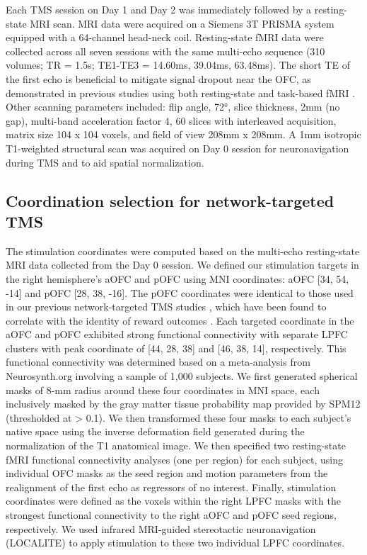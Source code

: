 \documentclass[lineno,sn-basic]{sn-jnl}%
\begin{document}
Each TMS session on Day 1 and Day 2 was immediately followed by a
resting-state MRI scan. MRI data were acquired on a Siemens 3T PRISMA
system equipped with a 64-channel head-neck coil. Resting-state fMRI
data were collected across all seven sessions with the same multi-echo
sequence (310 volumes; TR = 1.5s; TE1-TE3 = 14.60ms, 39.04ms, 63.48ms).
The short TE of the first echo is beneficial to mitigate signal dropout
near the OFC, as demonstrated in previous studies using both resting-state and task-based fMRI \citep{RN619,RN524,kirlutpos16,zhao24img}. Other scanning parameters included: flip angle, 72°, slice thickness, 2mm (no gap), multi-band acceleration factor 4, 60 slices with interleaved acquisition, matrix size 104 x 104 voxels, and field of view 208mm x 208mm. A 1mm isotropic T1-weighted structural scan was acquired on Day 0 session for neuronavigation during TMS and to aid spatial normalization.

\subsection{Coordination selection for network-targeted TMS} 
\label{coordination-selection}

The stimulation coordinates were computed based on the multi-echo resting-state MRI data collected from the Day 0 session. We defined our stimulation targets in the right hemisphere's aOFC and pOFC using MNI coordinates: aOFC {[}34, 54, -14{]} and pOFC {[}28, 38, -16{]}. The pOFC coordinates were identical to those used in our previous network-targeted TMS studies \citep{HowRey2020,liuyaoatt24,RN4,RN564}, which have been found to correlate with the identity of reward outcomes \citep{HowRey2020,RN4}. Each targeted coordinate in the aOFC and pOFC exhibited strong functional connectivity with separate LPFC clusters with peak coordinate of {[}44, 28, 38{]} and {[}46, 38, 14{]}, respectively. This functional connectivity was determined based on a meta-analysis from Neurosynth.org involving a sample of 1,000 subjects. We first generated spherical masks of 8-mm radius around these four coordinates in MNI space, each inclusively masked by the gray matter tissue probability map provided by SPM12 (thresholded at \textgreater{} 0.1). We then transformed these four masks to each subject's native space using the inverse deformation field generated during the normalization of the T1 anatomical image. We then specified two resting-state fMRI functional connectivity analyses (one per region) for each subject, using individual OFC masks as the seed region and motion parameters from the realignment of the first echo as regressors of no interest. Finally, stimulation coordinates were defined as the voxels within the right LPFC masks with the strongest functional connectivity to the right aOFC and pOFC seed regions, respectively. We used infrared MRI-guided stereotactic neuronavigation (LOCALITE) to apply stimulation to these two individual LPFC coordinates.
\end{document}
